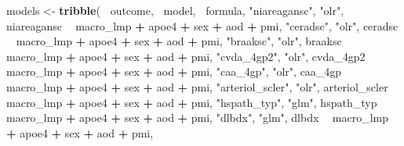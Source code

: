 \documentclass[]{book}
\newenvironment{Shaded}{\begin{snugshade}}{\end{snugshade}}
\newcommand{\KeywordTok}[1]{\textcolor[rgb]{0.13,0.29,0.53}{\textbf{#1}}}
\newcommand{\NormalTok}[1]{#1}
\newcommand{\OperatorTok}[1]{\textcolor[rgb]{0.81,0.36,0.00}{\textbf{#1}}}
\newcommand{\StringTok}[1]{\textcolor[rgb]{0.31,0.60,0.02}{#1}}
\begin{document}
\begin{Shaded}
\begin{Highlighting}[]
{{{{{\NormalTok{models <-}\StringTok{ }\KeywordTok{tribble}\NormalTok{(}
  \OperatorTok{~}\NormalTok{outcome, }\OperatorTok{~}\NormalTok{model, }\OperatorTok{~}\NormalTok{formula, }
  \StringTok{"niareagansc"}\NormalTok{, }\StringTok{"olr"}\NormalTok{, niareagansc }\OperatorTok{~}\StringTok{ }\NormalTok{macro_lmp }\OperatorTok{+}\StringTok{ }\NormalTok{apoe4 }\OperatorTok{+}\StringTok{ }\NormalTok{sex }\OperatorTok{+}\StringTok{ }\NormalTok{aod }\OperatorTok{+}\StringTok{ }\NormalTok{pmi, }
  \StringTok{"ceradsc"}\NormalTok{, }\StringTok{"olr"}\NormalTok{, ceradsc }\OperatorTok{~}\StringTok{ }\NormalTok{macro_lmp }\OperatorTok{+}\StringTok{ }\NormalTok{apoe4 }\OperatorTok{+}\StringTok{ }\NormalTok{sex }\OperatorTok{+}\StringTok{ }\NormalTok{aod }\OperatorTok{+}\StringTok{ }\NormalTok{pmi,}
  \StringTok{"braaksc"}\NormalTok{, }\StringTok{"olr"}\NormalTok{, braaksc }\OperatorTok{~}\StringTok{ }\NormalTok{macro_lmp }\OperatorTok{+}\StringTok{ }\NormalTok{apoe4 }\OperatorTok{+}\StringTok{ }\NormalTok{sex }\OperatorTok{+}\StringTok{ }\NormalTok{aod }\OperatorTok{+}\StringTok{ }\NormalTok{pmi,}
  \StringTok{"cvda_4gp2"}\NormalTok{, }\StringTok{"olr"}\NormalTok{, cvda_4gp2 }\OperatorTok{~}\StringTok{ }\NormalTok{macro_lmp }\OperatorTok{+}\StringTok{ }\NormalTok{apoe4 }\OperatorTok{+}\StringTok{ }\NormalTok{sex }\OperatorTok{+}\StringTok{ }\NormalTok{aod }\OperatorTok{+}\StringTok{ }\NormalTok{pmi, }
  \StringTok{"caa_4gp"}\NormalTok{, }\StringTok{"olr"}\NormalTok{, caa_4gp }\OperatorTok{~}\StringTok{ }\NormalTok{macro_lmp }\OperatorTok{+}\StringTok{ }\NormalTok{apoe4 }\OperatorTok{+}\StringTok{ }\NormalTok{sex }\OperatorTok{+}\StringTok{ }\NormalTok{aod }\OperatorTok{+}\StringTok{ }\NormalTok{pmi,}
  \StringTok{"arteriol_scler"}\NormalTok{, }\StringTok{"olr"}\NormalTok{, arteriol_scler }\OperatorTok{~}\StringTok{ }\NormalTok{macro_lmp }\OperatorTok{+}\StringTok{ }\NormalTok{apoe4 }\OperatorTok{+}\StringTok{ }\NormalTok{sex }\OperatorTok{+}\StringTok{ }\NormalTok{aod }\OperatorTok{+}\StringTok{ }\NormalTok{pmi,}
  \StringTok{"hspath_typ"}\NormalTok{, }\StringTok{"glm"}\NormalTok{, hspath_typ }\OperatorTok{~}\StringTok{ }\NormalTok{macro_lmp }\OperatorTok{+}\StringTok{ }\NormalTok{apoe4 }\OperatorTok{+}\StringTok{ }\NormalTok{sex }\OperatorTok{+}\StringTok{ }\NormalTok{aod }\OperatorTok{+}\StringTok{ }\NormalTok{pmi,}
  \StringTok{"dlbdx"}\NormalTok{, }\StringTok{"glm"}\NormalTok{, dlbdx }\OperatorTok{~}\StringTok{ }\NormalTok{macro_lmp }\OperatorTok{+}\StringTok{ }\NormalTok{apoe4 }\OperatorTok{+}\StringTok{ }\NormalTok{sex }\OperatorTok{+}\StringTok{ }\NormalTok{aod }\OperatorTok{+}\StringTok{ }\NormalTok{pmi,}
}}}}}
\end{Highlighting}
\end{Shaded}
\end{document}
